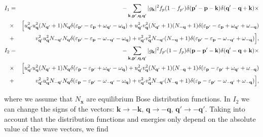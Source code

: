 \begin{footnotesize}
\begin{eqnarray}\label{AP7_I1I2}
I_1&=&-\sum_{\mathbf{k},\mathbf{p}',\mathbf{q},\mathbf{q}'}|g_\textbf{k}|^2f_p(1-f_{p'})\delta(\textbf{p}'-\textbf{p}-\textbf{k})\delta(\textbf{q}'-\textbf{q}+\textbf{k})\times\\\nonumber
&\times&\Bigl[u^2_{\textbf{q}'}u^2_{\textbf{q}}(N_{\textbf{q}'}+1)N_{\textbf{q}}
\delta(\varepsilon_{\textbf{p}'}-\varepsilon_{\textbf{p}}+\omega_{\textbf{q}'}-\omega_{\textbf{q}})
+u^2_{\textbf{q}'}v^2_{\textbf{q}}(N_{\textbf{q}'}+1)(N_{-\textbf{q}}+1)
\delta(\varepsilon_{\textbf{p}'}-\varepsilon_{\textbf{p}}+\omega_{\textbf{q}'}+\omega_{-\textbf{q}})\\\nonumber
&+&v^2_{\textbf{q}'}u^2_{\textbf{q}}N_{-\textbf{q}'}N_{\textbf{q}}
\delta(\varepsilon_{\textbf{p}'}-\varepsilon_{\textbf{p}}-\omega_{-\textbf{q}'}-\omega_{\textbf{q}})
+v^2_{\textbf{q}'}v^2_{\textbf{q}}N_{-\textbf{q}'}(N_{-\textbf{q}}+1)
\delta(\varepsilon_{\textbf{p}'}-\varepsilon_{\textbf{p}}-\omega_{-\textbf{q}'}+\omega_{-\textbf{q}})\Bigr],\\
\nonumber
I_2&=&-\sum_{\mathbf{k},\mathbf{p}',\mathbf{q},\mathbf{q}'}|g_\textbf{k}|^2f_{p'}(1-f_{p})\delta(\textbf{p}-\textbf{p}'-\textbf{k})\delta(\textbf{q}'-\textbf{q}+\textbf{k})\times\\\nonumber
&\times&\Bigl[u^2_{\textbf{q}'}u^2_{\textbf{q}}(N_{\textbf{q}'}+1)N_{\textbf{q}}
\delta(\varepsilon_{\textbf{p}}-\varepsilon_{\textbf{p}'}+\omega_{\textbf{q}'}-\omega_{\textbf{q}})
+u^2_{\textbf{q}'}v^2_{\textbf{q}}(N_{\textbf{q}'}+1)(N_{-\textbf{q}}+1)
\delta(\varepsilon_{\textbf{p}}-\varepsilon_{\textbf{p}'}+\omega_{\textbf{q}'}+\omega_{-\textbf{q}})\\\nonumber
&+&v^2_{\textbf{q}'}u^2_{\textbf{q}}N_{-\textbf{q}'}N_{\textbf{q}}
\delta(\varepsilon_{\textbf{p}}-\varepsilon_{\textbf{p}'}-\omega_{-\textbf{q}'}-\omega_{\textbf{q}})
+v^2_{\textbf{q}'}v^2_{\textbf{q}}N_{-\textbf{q}'}(N_{-\textbf{q}}+1)
\delta(\varepsilon_{\textbf{p}}-\varepsilon_{\textbf{p}'}-\omega_{-\textbf{q}'}+\omega_{-\textbf{q}})\Bigr],
\end{eqnarray}
\end{footnotesize}
%
where we assume that $N_\mathbf{x}$ are equilibrium Bose distribution functions. In $I_2$ we can change the signs of the vectors: $\textbf{k}\rightarrow-\textbf{k},\,\textbf{q}\rightarrow-\textbf{q},\,\textbf{q}'\rightarrow-\textbf{q}'$. Taking into account that the distribution functions and energies only depend on the absolute value of the wave vectors, we find
